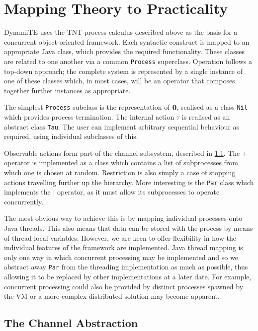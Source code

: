 \documentclass{acm_proc_article-sp}
\begin{document}
\section{Mapping Theory to Practicality}
\label{dynamite}

DynamiTE uses the TNT process calculus described above as the basis for
a concurrent object-oriented framework.  Each syntactic construct is
mapped to an appropriate Java class, which provides the required
functionality.  These classes are related to one another via a common
\texttt{Process} superclass.  Operation follows a top-down approach; the
complete system is represented by a single instance of one of these
classes which, in most cases, will be an operator that composes together
further instances as appropriate.

The simplest \texttt{Process} subclass is the representation of $\textbf{0}$,
realised as a class \texttt{Nil} which provides process termination.
The internal action $\tau$ is realised as an abstract class
\texttt{Tau}.  The user can implement arbitrary sequential behaviour as
required, using individual subclasses of this.

Observable actions form part of the channel subsystem, described in
\ref{channels}.  The $+$ operator is implemented as a class which
contains a list of subprocesses from which one is chosen at random.
Restriction is also simply a case of stopping actions travelling further
up the hierarchy.  More interesting is the \texttt{Par} class which
implements the $\mid$ operator, as it must allow its subprocesses to
operate concurrently.

The most obvious way to achieve this is by mapping individual processes
onto Java threads.  This also means that data can be stored with the
process by means of thread-local variables.  However, we are keen to
offer flexibility in how the individual features of the framework are
implemented.  Java thread mapping is only one way in which concurrent
processing may be implemented and so we abstract away \texttt{Par} from
the threading implementation as much as possible, thus allowing it to be
replaced by other implementations at a later date.  For example,
concurrent processing could also be provided by distinct processes
spawned by the VM or a more complex distributed solution may become
apparent.

\subsection{The Channel Abstraction}
\label{channels}
\end{document}
